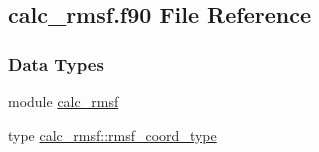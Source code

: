 \hypertarget{calc__rmsf_8f90}{\subsection{calc\-\_\-rmsf.\-f90 File Reference}
\label{calc__rmsf_8f90}
}
\subsubsection*{Data Types}
\begin{DoxyCompactItemize}
\item 
module \hyperlink{classcalc__rmsf}{calc\-\_\-rmsf}
\item 
type \hyperlink{structcalc__rmsf_1_1rmsf__coord__type}{calc\-\_\-rmsf\-::rmsf\-\_\-coord\-\_\-type}
\end{DoxyCompactItemize}
